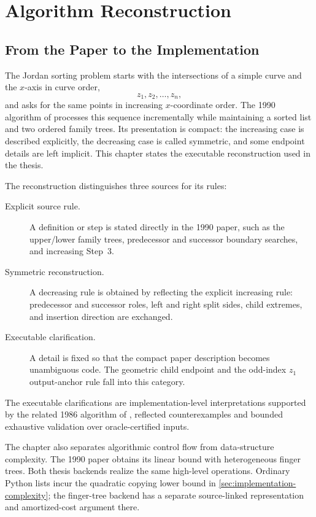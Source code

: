 \chapter{Algorithm Reconstruction}
\label{chap:algorithm}

\section{From the Paper to the Implementation}
\label{sec:algorithm-boundary}

The Jordan sorting problem starts with the intersections of a simple curve
and the $x$-axis in curve order,
\begin{equation}
  z_1,z_2,\ldots,z_n,
\end{equation}
and asks for the same points in increasing $x$-coordinate order. The 1990
algorithm of \textcite{fung1990simplified} processes this sequence
incrementally while maintaining a sorted list and two ordered family trees.
Its presentation is compact: the increasing case is described explicitly,
the decreasing case is called symmetric, and some endpoint details are left
implicit. This chapter states the executable reconstruction used in the
thesis.

The reconstruction distinguishes three sources for its rules:
\begin{description}
  \item[Explicit source rule.] A definition or step is stated directly in the
    1990 paper, such as the upper/lower family trees, predecessor and successor
    boundary searches, and increasing Step~3.
  \item[Symmetric reconstruction.] A decreasing rule is obtained by reflecting
    the explicit increasing rule: predecessor and successor roles, left and
    right split sides, child extremes, and insertion direction are exchanged.
  \item[Executable clarification.] A detail is fixed so that the compact paper
    description becomes unambiguous code. The geometric child endpoint and
    the odd-index $z_1$ output-anchor rule fall into this category.
\end{description}

The executable clarifications are implementation-level interpretations
supported by the related 1986 algorithm of \textcite{hoffmann1986sorting},
reflected counterexamples and bounded exhaustive validation over
oracle-certified inputs.

The chapter also separates algorithmic control flow from data-structure
complexity. The 1990 paper obtains its linear bound with heterogeneous finger
trees. Both thesis backends realize the same high-level operations. Ordinary
Python lists incur the quadratic copying lower bound in
\cref{sec:implementation-complexity}; the finger-tree backend has a separate
source-linked representation and amortized-cost argument there.

